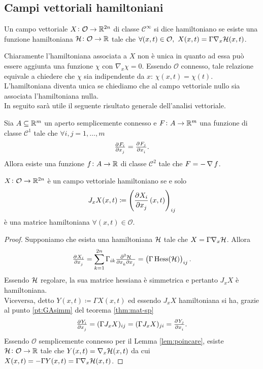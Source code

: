 \subsection{Campi vettoriali hamiltoniani}

\begin{definition}
    Un campo vettoriale $ X \colon \mathcal{O} \to \mathbb{R}^{2n} $ di classe $ \mathcal{C}^\infty $ si dice hamiltoniano se esiste una funzione hamiltoniana $ \mathcal{H} \colon \mathcal{O} \to \mathbb{R} $ tale che $ \forall (x, t) \in \mathcal{O}, \ X(x, t) = \Gamma \nabla_x \mathcal{H}(x, t) $.
\end{definition}

Chiaramente l'hamiltoniana associata a $ X $ non è unica in quanto ad essa può essere aggiunta una funzione $ \chi $ con $ \nabla_x \chi = 0 $. Essendo $ \mathcal{O} $ connesso, tale relazione equivale a chiedere che $ \chi $ sia indipendente da $ x $: $ \chi(x, t) = \chi(t) $. L'hamiltoniana diventa unica se chiediamo che al campo vettoriale nullo sia associata l'hamiltoniana nulla. \\

In seguito sarà utile il seguente risultato generale dell'analisi vettoriale.

\begin{lemma}[Poincaré] \label{lem:poincare}
    Sia $ A \subseteq \mathbb{R}^m $ un aperto semplicemente connesso e $ F \colon A \to \mathbb{R}^m $ una funzione di classe $ \mathcal{C}^1 $ tale che $ \forall i, j = 1, \ldots, m $
    \[
        \pd{F_i}{x_j} = \pd{F_j}{x_i}.
    \]
    Allora esiste una funzione $ f \colon A \to \mathbb{R} $ di classe $ \mathcal{C}^2 $ tale che $ F = - \operatorname{\nabla}{f} $.
\end{lemma}

\begin{thm} \label{thm:campo-hamiltoniano}
    $ X \colon \mathcal{O} \to \mathbb{R}^{2n} $ è un campo vettoriale hamiltoniano se e solo
    \begin{equation}
        J_x X (x, t) \coloneqq \left(\dpd{X_i}{x_j}(x, t)\right)_{ij}
    \end{equation}
    è una matrice hamiltoniana $ \forall (x, t) \in \mathcal{O} $.
\end{thm}
\begin{proof}
    Supponiamo che esista una hamiltoniana $ \mathcal{H} $ tale che $ X = \Gamma \nabla_x \mathcal{H} $. Allora
    \[
        \pd{X_i}{x_j} = \sum_{k=1}^{2n} \Gamma_{ik} \md{\ham}{2}{x_k}{}{x_j}{} = \left( \Gamma \, \mathrm{Hess}(\ham) \right)_{ij}.
    \]
    Essendo $ \mathcal{H} $ regolare, la sua matrice hessiana è simmetrica e pertanto $ J_x X $ è hamiltoniana. \\
    Viceversa, detto $ Y(x, t) \coloneqq \Gamma X(x, t) $ ed essendo $ J_x X $ hamiltoniana si ha, grazie al punto \ref{pt:GAsimm} del teorema \ref{thm:mat-sp}
    \[
        \pd{Y_i}{x_j} = (\Gamma J_x X)_{ij} = (\Gamma J_x X)_{ji} = \pd{Y_j}{x_i}.
    \]
    Essendo $ \mathcal{O} $ semplicemente connesso per il Lemma \ref{lem:poincare},  esiste $ \mathcal{H} \colon \mathcal{O} \to \mathbb{R} $ tale che $ Y(x, t) = \nabla_x \mathcal{H}(x, t) $ da cui $ X(x, t) = -\Gamma Y(x, t) = \Gamma \nabla_x \mathcal{H}(x, t) $.
\end{proof}

